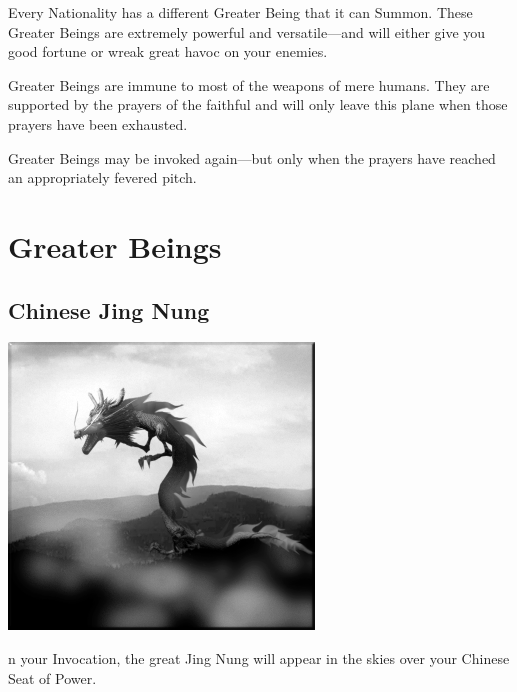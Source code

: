 Every Nationality has a different Greater Being that it can Summon. These Greater Beings are extremely powerful and versatile---and will either give you good fortune or wreak great havoc on your enemies.

Greater Beings are immune to most of the weapons of mere humans. They are supported by the prayers of the faithful and will only leave this plane when those prayers have been exhausted.

Greater Beings may be invoked again---but only when the prayers have reached an appropriately fevered pitch.

\clearpage %

\section{Greater Beings}

\subsection{Chinese Jing Nung}


\begin{center}
	\includegraphics[width=.9\linewidth]{Ajingnung}
\end{center}

n your Invocation, the great Jing Nung will appear in the skies over your Chinese Seat of Power.

